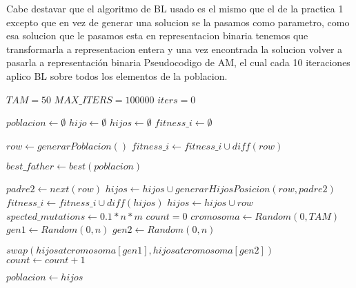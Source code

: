 Cabe destavar que el algoritmo de BL usado es el mismo que el de la practica 1 excepto que en vez de generar una solucion se la pasamos como parametro,
como esa solucion que le pasamos esta en representacion binaria tenemos que transformarla a representacion entera y una vez encontrada la solucion volver a pasarla a representación binaria
Pseudocodigo de AM, el cual cada 10 iteraciones aplico BL sobre todos los elementos de la poblacion.
\begin{algorithm}[H]
  \begin{algorithmic}[1]
      \State $TAM = 50$
      \State $MAX\_ITERS = 100000$
      \State $iters = 0$

      \State $poblacion \gets \emptyset$ 
      \State $hijo \gets \emptyset$ 
      \State $hijos \gets \emptyset$
      \State $fitness\_i \gets \emptyset$
      
        \State $row \gets generarPoblacion()$
        \State $fitness\_i \gets fitness\_i \cup diff(row)$
      \EndFor

        \State $best\_father \gets  best(poblacion)$ 

          \State $padre2 \gets next(row)$ 
            \State $hijos \gets hijos \cup generarHijosPosicion(row,padre2)$
            \State $fitness\_i \gets fitness\_i \cup diff(hijos)$  
          \Else
            \State $hijos \gets hijos \cup row$
          \EndIf
        \EndFor
        \State $spected\_mutations \gets 0.1*n*m$
        \State $count = 0$
          \State $cromosoma \gets Random(0,TAM)$ 
          \State $gen1 \gets Random(0,n)$
          \State $gen2 \gets Random(0,n)$ 

           
            \State $swap(hijos at cromosoma[gen1], hijos at cromosoma[gen2])$
          \EndIf
          \State $count \gets count +1 $
        \EndWhile

        \State $poblacion \gets hijos$ 


\end{algorithmic}
\end{algorithm}
